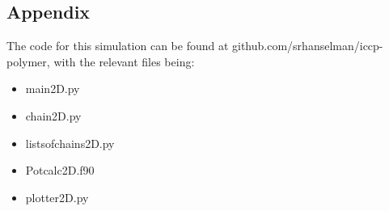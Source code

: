 \documentclass{article}
\begin{document}
\begin{multicols}{2}
\subsection*{Appendix}
The code for this simulation can be found at github.com/srhanselman/iccp-polymer, with the relevant files being:
\begin{itemize}
\item main2D.py
\item chain2D.py
\item listsofchains2D.py 
\item Potcalc2D.f90
\item plotter2D.py
\end{itemize}
\end{multicols}
\end{document}
